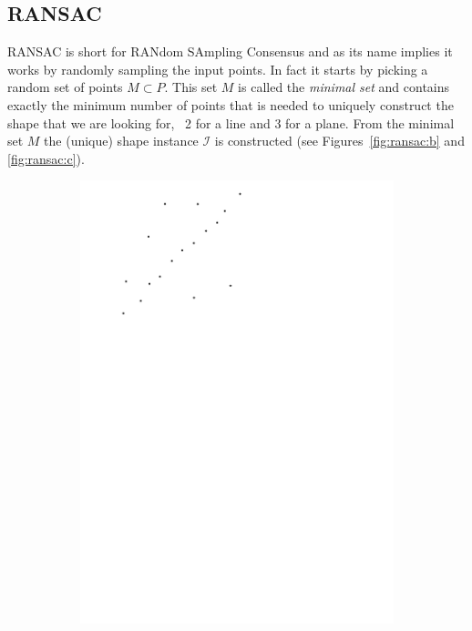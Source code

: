 \subsection{RANSAC}

RANSAC is short for RANdom SAmpling Consensus and as its name implies it works by randomly sampling the input points.
In fact it starts by picking a random set of points $M \subset P$. 
This set $M$ is called the \emph{minimal set} and contains exactly the minimum number of points that is needed to uniquely construct the shape that we are looking for, \eg\ 2 for a line and 3 for a plane. 
From the minimal set $M$ the (unique) shape instance $\mathcal{I}$ is constructed (see Figures~\ref{fig:ransac:b} and \ref{fig:ransac:c}).
\begin{figure}[htb]
	\centering
	\begin{subfigure}[b]{0.24\linewidth}
		\centering
		\includegraphics[width=\textwidth,page=1]{figs/ransac.pdf}

\end{subfigure}
\end{figure}
